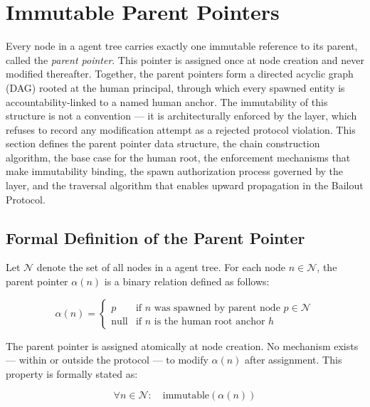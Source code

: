 \section{Immutable Parent Pointers}
\label{sec:immutable-parent-pointers}

Every node in a \bxthree{} agent tree carries exactly one immutable reference to its parent, called the \emph{parent pointer}. This pointer is assigned once at node creation and never modified thereafter. Together, the parent pointers form a directed acyclic graph (DAG) rooted at the human principal, through which every spawned entity is accountability-linked to a named human anchor. The immutability of this structure is not a convention — it is architecturally enforced by the \fact{} layer, which refuses to record any modification attempt as a rejected protocol violation. This section defines the parent pointer data structure, the chain construction algorithm, the base case for the human root, the enforcement mechanisms that make immutability binding, the spawn authorization process governed by the \purpose{} layer, and the traversal algorithm that enables upward propagation in the Bailout Protocol.

\subsection{Formal Definition of the Parent Pointer}

Let $\mathcal{N}$ denote the set of all nodes in a \bxthree{} agent tree. For each node $n \in \mathcal{N}$, the parent pointer $\alpha(n)$ is a binary relation defined as follows:

\begin{equation}
\alpha(n) = 
\begin{cases}
p & \text{if } n \text{ was spawned by parent node } p \in \mathcal{N} \\[4pt]
\text{null} & \text{if } n \text{ is the human root anchor } h
\end{cases}
\tag{PP-1}
\end{equation}

The parent pointer is assigned atomically at node creation. No mechanism exists — within or outside the \bxthree{} protocol — to modify $\alpha(n)$ after assignment. This property is formally stated as:

\begin{equation}
\forall n \in \mathcal{N}: \quad \text{immutable}(\alpha(n)) \tag{PP-2}
\end{equation}

